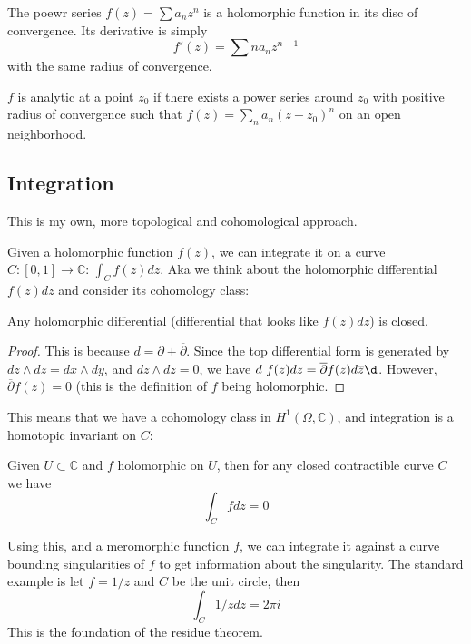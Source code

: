 \documentclass[main.tex]{subfiles}
\begin{document}
\begin{theorem}
The poewr series $f(z) = \sum a_n z^n$ is a holomorphic function in its disc of convergence. Its derivative is simply 
$$
f'(z) = \sum n a_n z^{n-1}
$$
with the same radius of convergence.
\end{theorem}

$f$ is analytic at a point $z_0$ if there exists a power series around $z_0$ with positive radius of convergence such that $f(z) = \sum_n a_n (z - z_0)^n$ on an open neighborhood. 




\subsection{Integration}
\begin{remark}
This is my own, more topological and cohomological approach.
\end{remark}
Given a holomorphic function $f(z)$, we can integrate it on a curve $C: [0,1] \rightarrow \mathbb{C}$: $\int_C f(z) dz$. Aka we think about the holomorphic differential $f(z) dz$ and consider its cohomology class:

\begin{lemma}
Any holomorphic differential (differential that looks like $f(z) dz$) is closed. 
\end{lemma}

\begin{proof}
This is because $d = \partial + \overline{\partial}$. Since the top differential form is generated by $dz \wedge d\overline{z} = dx \wedge dy$, and $dz \wedge dz = 0$, we have $d \ f(z) dz = \overline{\partial} f(z) d\overline{z} \d$. However, $\overline{\partial} f(z) = 0$ (this is the definition of $f$ being holomorphic. 
\end{proof}

This means that we have a cohomology class in $H^1(\Omega, \mathbb{C})$, and integration is a homotopic invariant on $C$:

\begin{corollary}
Given $U \subset \mathbb{C}$ and $f$ holomorphic on $U$, then for any closed contractible curve $C$ we have 
$$
\int_C f dz = 0
$$
\end{corollary}

Using this, and a meromorphic function $f$, we can integrate it against a curve bounding singularities of $f$ to get information about the singularity. The standard example is let $f = 1/z$ and $C$ be the unit circle, then 
$$
\int_C 1/z dz = 2\pi i
$$
This is the foundation of the residue theorem. 
\end{document}
